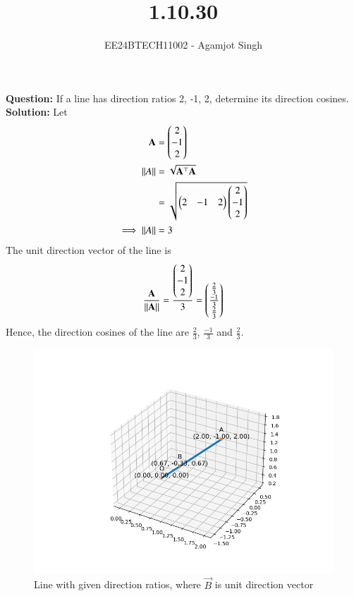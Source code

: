 \documentclass[journal]{IEEEtran}
\begin{document}

\vspace{3cm}

\title{1.10.30}
\author{EE24BTECH11002 - Agamjot Singh
}
{\let\newpage\relax\maketitle}

\renewcommand{\thefigure}{\theenumi}
\renewcommand{\thetable}{\theenumi}
\setlength{\intextsep}{10pt} %

\textbf{Question:}
\newline
If a line has direction ratios 2, -1, 2, determine its direction cosines.
\newline
\textbf{Solution:}
\newline
Let 
\begin{align}
	\mathbf{A} &= \begin{pmatrix}2\\-1\\2\end{pmatrix}\\
	\left\lVert A\right\rVert &= \sqrt{\mathbf{A}^\top\mathbf{A}}\\
		     &= \sqrt{\begin{pmatrix}2 & -1 & 2\end{pmatrix}\begin{pmatrix}2\\-1\\2\end{pmatrix}}\\
	\implies \left\lVert A\right\rVert &= 3
\end{align}
The unit direction vector of the line is
\begin{align}
	\frac{\mathbf{A}}{\left\lVert\mathbf{A}\right\rVert} = \frac{\begin{pmatrix}2\\-1\\2\end{pmatrix}}{3} = \begin{pmatrix}\frac{2}{3}\\\frac{-1}{3}\\\frac{2}{3}\end{pmatrix}
\end{align}
Hence, the direction cosines of the line are $\frac{2}{3}$, $\frac{-1}{3}$ and $\frac{2}{3}$.

\begin{figure}[h!]
   \centering
   \includegraphics[width=0.7\linewidth]{figs/graph.png}
   \caption{Line with given direction ratios, where $\vec{B}$ is unit direction vector}
\end{figure}
\end{document}
